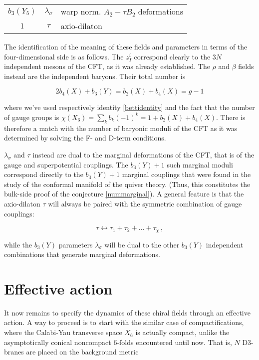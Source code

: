 \begin{center}
\begin{tabular}{|c | c | l |}
	\hline
	$b_3(Y_5)$ 	& $\lambda_\sigma$	& warp norm. $A_2 - \tau B_2$ deformations\\
	$1$		& $\tau$		& axio-dilaton\\
	\hline
\end{tabular}
\end{center}

The identification of the meaning of these fields and parameters in terms of the four-dimensional side is as follows. The $z_I^i$ correspond clearly to the $3N$ independent mesons of the CFT, as it was already established. The $\rho$ and $\beta$ fields instead are the independent baryons. Their total number is

\begin{equation}
	2 b_4(X) + b_3(Y) = b_2(X) + b_4(X) = g - 1
	\label{}
\end{equation}

where we've used respectively identity \ref{bettidentity} and the fact that the number of gauge groups is $\chi(X_6) = \sum_k b_k (-1)^k = 1 + b_2(X) + b_4(X) $. There is therefore a match with the number of baryonic moduli of the CFT as it was determined by solving the F- and D-term conditions.

$\lambda_\sigma$ and $\tau$ instead are dual to the marginal deformations of the CFT, that is of the gauge and superpotential couplings. The $b_3(Y) + 1$ such marginal moduli correspond directly to the $b_3(Y) + 1$ marginal couplings that were found in the study of the conformal manifold of the quiver theory. (Thus, this constitutes the bulk-side proof of the conjecture \eqref{nummarginal}). A general feature is that the axio-dilaton $\tau$ will always be paired with the symmetric combination of gauge couplings:

\begin{equation}
	\tau \leftrightarrow \tau_1 + \tau_2 + \ldots + \tau_\chi\,,
	\label{}
\end{equation}

while the $b_3(Y)$ parameters $\lambda_\sigma$ will be dual to the other $b_3(Y)$ independent combinations that generate marginal deformations.

\section{Effective action}

It now remains to specify the dynamics of these chiral fields through an effective action. A way to proceed is to start with the similar case of compactifications\cite{MZ_2}, where the Calabi-Yau transverse space $X_6$ is actually compact, unlike the asymptotically conical noncompact 6-folds encountered until now. That is, $N$ D3-branes are placed on the background metric


